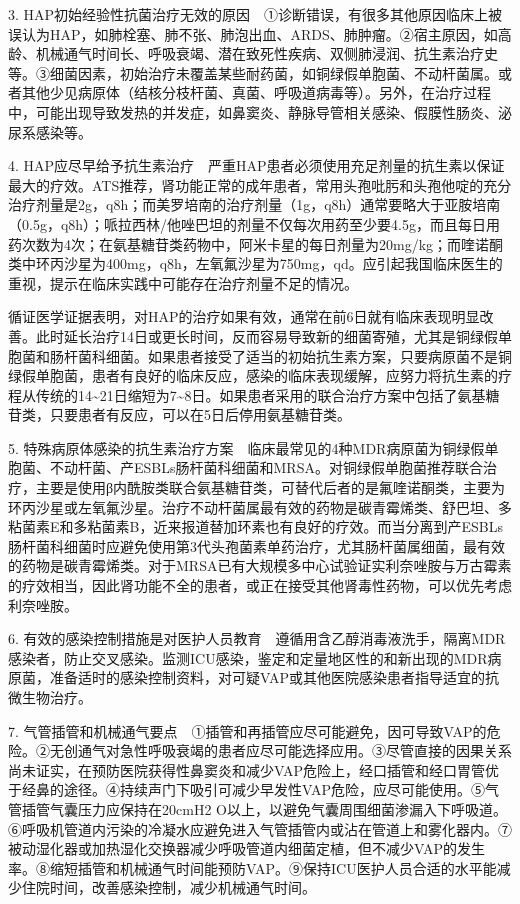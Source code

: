 3.
HAP初始经验性抗菌治疗无效的原因　①诊断错误，有很多其他原因临床上被误认为HAP，如肺栓塞、肺不张、肺泡出血、ARDS、肺肿瘤。②宿主原因，如高龄、机械通气时间长、呼吸衰竭、潜在致死性疾病、双侧肺浸润、抗生素治疗史等。③细菌因素，初始治疗未覆盖某些耐药菌，如铜绿假单胞菌、不动杆菌属。或者其他少见病原体（结核分枝杆菌、真菌、呼吸道病毒等）。另外，在治疗过程中，可能出现导致发热的并发症，如鼻窦炎、静脉导管相关感染、假膜性肠炎、泌尿系感染等。

4.
HAP应尽早给予抗生素治疗　严重HAP患者必须使用充足剂量的抗生素以保证最大的疗效。ATS推荐，肾功能正常的成年患者，常用头孢吡肟和头孢他啶的充分治疗剂量是2g，q8h；而美罗培南的治疗剂量（1g，q8h）通常要略大于亚胺培南（0.5g，q8h）；哌拉西林/他唑巴坦的剂量不仅每次用药至少要4.5g，而且每日用药次数为4次；在氨基糖苷类药物中，阿米卡星的每日剂量为20mg/kg；而喹诺酮类中环丙沙星为400mg，q8h，左氧氟沙星为750mg，qd。应引起我国临床医生的重视，提示在临床实践中可能存在治疗剂量不足的情况。

循证医学证据表明，对HAP的治疗如果有效，通常在前6日就有临床表现明显改善。此时延长治疗14日或更长时间，反而容易导致新的细菌寄殖，尤其是铜绿假单胞菌和肠杆菌科细菌。如果患者接受了适当的初始抗生素方案，只要病原菌不是铜绿假单胞菌，患者有良好的临床反应，感染的临床表现缓解，应努力将抗生素的疗程从传统的14\textasciitilde{}21日缩短为7\textasciitilde{}8日。如果患者采用的联合治疗方案中包括了氨基糖苷类，只要患者有反应，可以在5日后停用氨基糖苷类。

5.
特殊病原体感染的抗生素治疗方案　临床最常见的4种MDR病原菌为铜绿假单胞菌、不动杆菌、产ESBLs肠杆菌科细菌和MRSA。对铜绿假单胞菌推荐联合治疗，主要是使用β内酰胺类联合氨基糖苷类，可替代后者的是氟喹诺酮类，主要为环丙沙星或左氧氟沙星。治疗不动杆菌属最有效的药物是碳青霉烯类、舒巴坦、多粘菌素E和多粘菌素B，近来报道替加环素也有良好的疗效。而当分离到产ESBLs肠杆菌科细菌时应避免使用第3代头孢菌素单药治疗，尤其肠杆菌属细菌，最有效的药物是碳青霉烯类。对于MRSA已有大规模多中心试验证实利奈唑胺与万古霉素的疗效相当，因此肾功能不全的患者，或正在接受其他肾毒性药物，可以优先考虑利奈唑胺。

6.
有效的感染控制措施是对医护人员教育　遵循用含乙醇消毒液洗手，隔离MDR感染者，防止交叉感染。监测ICU感染，鉴定和定量地区性的和新出现的MDR病原菌，准备适时的感染控制资料，对可疑VAP或其他医院感染患者指导适宜的抗微生物治疗。

7.
气管插管和机械通气要点　①插管和再插管应尽可能避免，因可导致VAP的危险。②无创通气对急性呼吸衰竭的患者应尽可能选择应用。③尽管直接的因果关系尚未证实，在预防医院获得性鼻窦炎和减少VAP危险上，经口插管和经口胃管优于经鼻的途径。④持续声门下吸引可减少早发性VAP危险，应尽可能使用。⑤气管插管气囊压力应保持在20cmH{2}
O以上，以避免气囊周围细菌渗漏入下呼吸道。⑥呼吸机管道内污染的冷凝水应避免进入气管插管内或沾在管道上和雾化器内。⑦被动湿化器或加热湿化交换器减少呼吸管道内细菌定植，但不减少VAP的发生率。⑧缩短插管和机械通气时间能预防VAP。⑨保持ICU医护人员合适的水平能减少住院时间，改善感染控制，减少机械通气时间。


